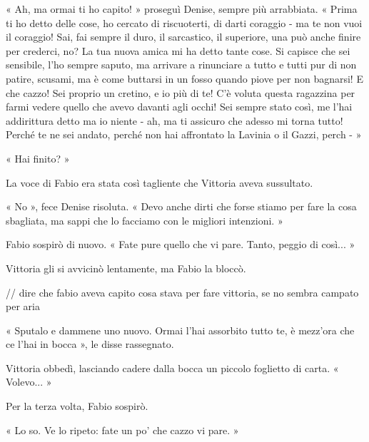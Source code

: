 « Ah, ma ormai ti ho capito! » proseguì Denise, sempre più arrabbiata. « Prima ti ho detto delle cose, ho cercato di riscuoterti, di darti coraggio - ma te non vuoi il coraggio! Sai, fai sempre il duro, il sarcastico, il superiore, una può anche finire per crederci, no? La tua nuova amica mi ha detto tante cose. Si capisce che sei sensibile, l'ho sempre saputo, ma arrivare a rinunciare a tutto e tutti pur di non patire, scusami, ma è come buttarsi in un fosso quando piove per non bagnarsi! E che cazzo! Sei proprio un cretino, e io più di te! C'è voluta questa ragazzina per farmi vedere quello che avevo davanti agli occhi! Sei sempre stato così, me l'hai addirittura detto ma io niente - ah, ma ti assicuro che adesso mi torna tutto! Perché te ne sei andato, perché non hai affrontato la Lavinia o il Gazzi, perch - »

« Hai finito? »

La voce di Fabio era stata così tagliente che Vittoria aveva sussultato.

« No », fece Denise risoluta. « Devo anche dirti che forse stiamo per fare la cosa sbagliata, ma sappi che lo facciamo con le migliori intenzioni. »

Fabio sospirò di nuovo. « Fate pure quello che vi pare. Tanto, peggio di così... »

Vittoria gli si avvicinò lentamente, ma Fabio la bloccò.

// dire che fabio aveva capito cosa stava per fare vittoria, se no sembra campato per aria

« Sputalo e dammene uno nuovo. Ormai l'hai assorbito tutto te, è mezz'ora che ce l'hai in bocca », le disse rassegnato.

Vittoria obbedì, lasciando cadere dalla bocca un piccolo foglietto di carta. « Volevo... »

Per la terza volta, Fabio sospirò.

« Lo so. Ve lo ripeto: fate un po' che cazzo vi pare. »
